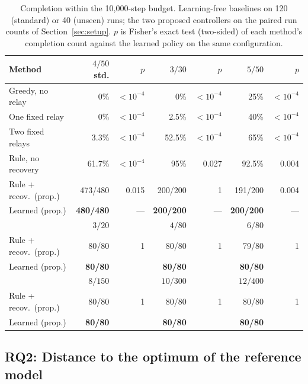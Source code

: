 \documentclass[final,5p,times,twocolumn]{elsarticle}
\begin{document}
\begin{table}[t]
\centering
\caption{Completion within the 10{,}000-step budget. Learning-free baselines on 120 (standard)
or 40 (unseen) runs; the two proposed controllers on the paired run counts of
Section~\ref{sec:setup}. $p$ is Fisher's exact test (two-sided) of each method's completion
count against the learned policy on the same configuration.}
\label{tab:completion}
\scriptsize
\setlength{\tabcolsep}{2.2pt}
\begin{tabular}{lrrrrrr}
\toprule
Method & $4/50$ std. & $p$ & $3/30$ & $p$ & $5/50$ & $p$ \\
\midrule
Greedy, no relay & 0\% & $<10^{-4}$ & 0\% & $<10^{-4}$ & 25\% & $<10^{-4}$ \\
One fixed relay & 0\% & $<10^{-4}$ & 2.5\% & $<10^{-4}$ & 40\% & $<10^{-4}$ \\
Two fixed relays & 3.3\% & $<10^{-4}$ & 52.5\% & $<10^{-4}$ & 65\% & $<10^{-4}$ \\
Rule, no recovery & 61.7\% & $<10^{-4}$ & 95\% & 0.027 & 92.5\% & 0.004 \\
Rule + recov.\ (prop.) & 473/480 & 0.015 & 200/200 & 1 & 191/200 & 0.004 \\
Learned (prop.) & \textbf{480/480} & --- & \textbf{200/200} & --- & \textbf{200/200} & --- \\
\midrule
 & $3/20$ & & $4/80$ & & $6/80$ & \\
Rule + recov.\ (prop.) & 80/80 & 1 & 80/80 & 1 & 79/80 & 1 \\
Learned (prop.) & \textbf{80/80} & & \textbf{80/80} & & \textbf{80/80} & \\
\midrule
 & $8/150$ & & $10/300$ & & $12/400$ & \\
Rule + recov.\ (prop.) & 80/80 & 1 & 80/80 & 1 & 80/80 & 1 \\
Learned (prop.) & \textbf{80/80} & & \textbf{80/80} & & \textbf{80/80} & \\
\bottomrule
\end{tabular}
\end{table}

\subsection{RQ2: Distance to the optimum of the reference model}
\label{sec:rq2}
\end{document}
